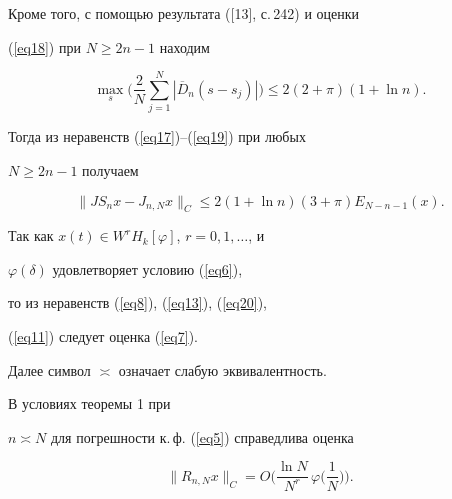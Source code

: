 \begin{pf}
\begin{equation}
\end{equation}


Кроме того, с помощью результата ([13], с.\,242) и оценки


(\ref{eq18}) при $N\geq2n-1$ находим


\begin{equation}\label{eq19}


\max_s\bigg(\frac{2}{N}\sum_{j=1}^N|\overline{D}_n(s-s_j)|\bigg)


\leq2(2+\pi)(1+\ln n).


\end{equation}


Тогда из неравенств (\ref{eq17})--(\ref{eq19}) при любых


$N\geq2n-1$ получаем


\begin{equation}\label{eq20}\|JS_nx-J_{n,N}x\|_C\leq


2(1+\ln n)(3+\pi)E_{N-n-1}(x).


\end{equation}





Так как $x(t)\in


W^rH_k[\varphi]$, $r=0,1,\dotsc$, и


$\varphi(\delta)$ удовлетворяет условию (\ref{eq6}),


то из неравенств (\ref{eq8}), (\ref{eq13}), (\ref{eq20}),


(\ref{eq11}) следует оценка (\ref{eq7}).


\end{pf}





Далее символ $\asymp$ означает слабую эквивалентность.








\begin{cor}


В условиях теоремы 1 при


$n\asymp N$ для погрешности к.\,ф. (\ref{eq5}) справедлива оценка


$$




\|R_{n,N}x\|_C=O\bigg(\frac{\ln


N}{N^r}\,\varphi\bigg(\frac{1}{N}\bigg)\bigg).




$$


\end{cor}








